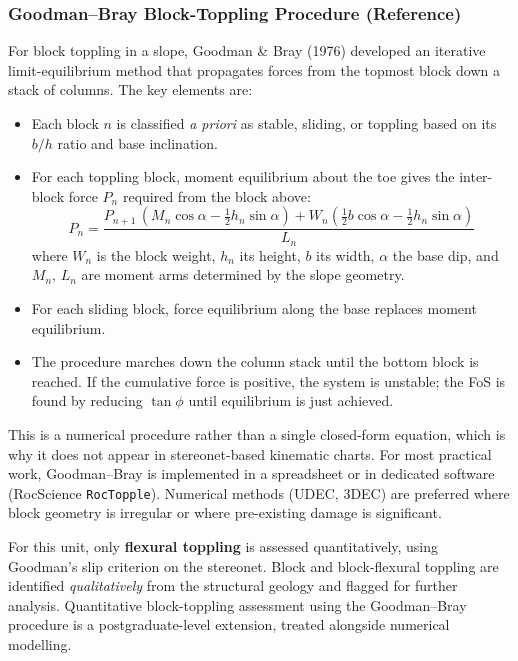 \documentclass[a4paper,12pt]{article}
\begin{document}
\subsubsection{Goodman--Bray Block-Toppling Procedure (Reference)}

For block toppling in a slope, Goodman \& Bray (1976) developed an iterative limit-equilibrium method that propagates forces from the topmost block down a stack of columns. The key elements are:
\begin{itemize}[nosep]
    \item Each block $n$ is classified \emph{a priori} as stable, sliding, or toppling based on its $b/h$ ratio and base inclination.
    \item For each toppling block, moment equilibrium about the toe gives the inter-block force $P_n$ required from the block above:
    \[
    P_n = \frac{P_{n+1}\,(M_n \cos\alpha - \tfrac{1}{2}h_n \sin\alpha) + W_n(\tfrac{1}{2}b\cos\alpha - \tfrac{1}{2}h_n \sin\alpha)}{L_n}
    \]
    where $W_n$ is the block weight, $h_n$ its height, $b$ its width, $\alpha$ the base dip, and $M_n,\,L_n$ are moment arms determined by the slope geometry.
    \item For each sliding block, force equilibrium along the base replaces moment equilibrium.
    \item The procedure marches down the column stack until the bottom block is reached. If the cumulative force is positive, the system is unstable; the FoS is found by reducing $\tan\phi$ until equilibrium is just achieved.
\end{itemize}
This is a numerical procedure rather than a single closed-form equation, which is why it does not appear in stereonet-based kinematic charts. For most practical work, Goodman--Bray is implemented in a spreadsheet or in dedicated software (RocScience \texttt{RocTopple}). Numerical methods (UDEC, 3DEC) are preferred where block geometry is irregular or where pre-existing damage is significant.

\begin{warnbox}
For this unit, only \textbf{flexural toppling} is assessed quantitatively, using Goodman's slip criterion on the stereonet. Block and block-flexural toppling are identified \emph{qualitatively} from the structural geology and flagged for further analysis. Quantitative block-toppling assessment using the Goodman--Bray procedure is a postgraduate-level extension, treated alongside numerical modelling.
\end{warnbox}
\end{document}
